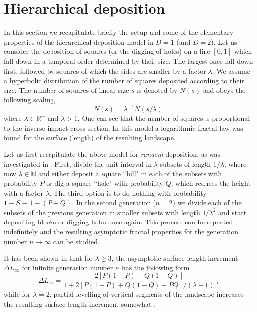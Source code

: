 \documentclass[amsmath,amssymb,amsfonts,aps,pre,preprint,superscriptaddress,bibnotes,showpacs,showkeys,longbibliography,nofootinbib]{revtex4-1}
\begin{document}
\section{Hierarchical deposition}\label{sec:1D}

In this section we recapitulate briefly the setup and some of the elementary properties of the hierarchical deposition model in  $D=1$ (and $D=2$). Let us consider the deposition of squares (or the digging of holes) on a line $[0,1]$  which fall down in a temporal order determined by their size. The largest ones fall down first, followed by squares of which the sides are smaller by a factor $\lambda$. We assume a hyperbolic distribution of the number of squares deposited according to their size. The number of squares of linear size $s$ is denoted by $N(s)$ and obeys the following scaling,
\begin{equation}
    \label{eq:square_distribution}
    N(s) = \lambda^{-1} N(s/\lambda)\, 
\end{equation}
where $\lambda\in\mathbb{R}^+$ and $\lambda > 1$. One can see that the number of squares is proportional to the inverse impact cross-section. In this model \cite{INDEKEU1998294,INDEKEU2000135} a logarithmic fractal law was found for the surface (length) of the resulting landscape.

Let us first recapitulate the above model for \textsl{random} deposition, as was investigated in \cite{INDEKEU1998294}. First, divide the unit interval in $\lambda$ subsets of length $1/\lambda$, where now $\lambda\in\mathbb{N}$ and either deposit a square ``hill" in each of the subsets with probability $P$ or dig a square ``hole" with probability $Q$, which reduces the height with a factor $\lambda$. The third option is to do nothing with probability $1-S \equiv 1-(P+Q)$. In the second generation ($n=2)$ we divide each of the subsets of the previous generation in smaller subsets with length $1/\lambda^2$ and start depositing blocks or digging holes once again. This process can be repeated indefinitely and the resulting asymptotic fractal properties for the generation number $n\rightarrow\infty$ can be studied. 

It has been shown in \cite{INDEKEU1998294} that for $\lambda \geq 3$, the asymptotic surface length increment $\Delta L_\infty$ for infinite generation number $n$ has the following form
\begin{equation}
    \label{eq:length_increment}
    \Delta L_\infty = \frac{2 \left[P(1-P)+Q(1-Q)\right]}{1+2 \left[P(1-P)+Q(1-Q)-PQ\right]/(\lambda-1)}\, ,
\end{equation}
while for $\lambda=2$, partial levelling of vertical segments of the landscape increases the resulting surface length increment somewhat \cite{INDEKEU1998294}.
\end{document}
